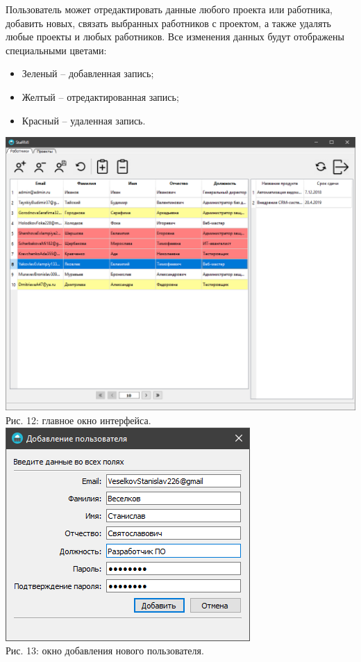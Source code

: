 \documentclass[14pt,a4paper,openbib]{extarticle}
\numberwithin{equation}{section}
\begin{document}
Пользователь может отредактировать данные любого проекта или работника, добавить новых, связать выбранных работников с проектом, а также удалять любые проекты и любых работников. Все изменения данных будут отображены специальными цветами:
\begin{itemize}
  \item Зеленый – добавленная запись;
  \item Желтый – отредактированная запись;
  \item Красный – удаленная запись.
\end{itemize}

\begin{center}
\includegraphics[width=\textwidth]{img/main_window_win.png}\\
Рис. 12: главное окно интерфейса.\\[\baselineskip]
\includegraphics[scale=0.6]{img/add_user_window_win.png}\\
Рис. 13: окно добавления нового пользователя.\\[\baselineskip]
\end{center}
\end{document}
